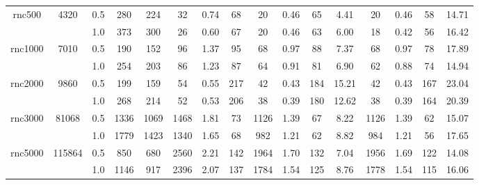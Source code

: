 \documentclass[10pt,journal]{IEEEtran}
\begin{document}
\begin{table}[!t]
\begin{tabular}{c|c|c|c|c|c|c|c|c|c|c|c|c|c|c|c}
\hline

\multicolumn{1}{c|}{\multirow{2}{*}{\hspace*{-0.5em}rnc500\hspace*{-0.5em}}}    &\multicolumn{1}{c|}{\multirow{2}{*}{4320}}   &0.5 &280  &224  &32   &0.74   &68 &20 &0.46  &65   &4.41 &20  &0.46   &58       &14.71  \\
&    &1.0 &373  &300  &26   &0.60   &67  &20 &0.46  &63  &6.00  &18 &0.42  &56     &16.42       \\

\hline

\multicolumn{1}{c|}{\multirow{2}{*}{\hspace*{-1em}rnc1000\hspace*{-1em}}}     &\multicolumn{1}{c|}{\multirow{2}{*}{7010}}  &0.5 &190  &152  &96   &1.37  &95 &68 &0.97 &88 &7.37  &68  &0.97   &78        &17.89   \\
&   &1.0 &254  &203  &86   &1.23   &87  &64 &0.91 &81   &6.90  &62   &0.88  &74       &14.94  \\

\hline

\multicolumn{1}{c|}{\multirow{2}{*}{\hspace*{-1em}rnc2000\hspace*{-1em}}}    &\multicolumn{1}{c|}{\multirow{2}{*}{9860}} &0.5  &199  &159  &54   &0.55   &217  &42 &0.43 &184 &15.21   &42   &0.43   &167      &23.04 \\
  &   &1.0 &268  &214  &52   &0.53   &206   & 38 &0.39 &180  &12.62   &38   &0.39  &164        &20.39 \\

\hline

\multicolumn{1}{c|}{\multirow{2}{*}{\hspace*{-1em}rnc3000\hspace*{-1em}}}     &\multicolumn{1}{c|}{\multirow{2}{*}{81068}}   &0.5  &1336  &1069  &1468    &1.81    &73   &1126  &1.39  &67 &8.22  &1126    &1.39   &62      &15.07  \\
   &    &1.0 &1779  &1423  &1340   &1.65   &68    &982  &1.21 &62   &8.82   &984   &1.21   &56       &17.65 \\

\hline

\multicolumn{1}{c|}{\multirow{2}{*}{\hspace*{-1em}rnc5000\hspace*{-1em}}}       &\multicolumn{1}{c|}{\multirow{2}{*}{115864}} &0.5   &850  &680  &2560    &2.21   &142  &1964  &1.70  &132  &7.04   &1956   &1.69   &122  &14.08  \\
                                    &             &1.0                                      &1146  &917  &2396   &2.07   &137 &1784 &1.54 &125   &8.76   &1778   &1.54   &115      &16.06   \\


\end{tabular}
\end{table}
\end{document}
